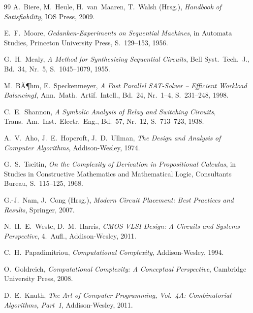 ﻿\documentclass[a4paper,12pt]{article}
\theoremstyle{definition}
\begin{document}
\begin{thebibliography}{99}
A.~Biere, M.~Heule, H.~van~Maaren, T.~Walsh (Hrsg.),
\emph{Handbook of Satisfiability},
IOS Press, 2009.

E.~F.~Moore,
\emph{Gedanken-Experiments on Sequential Machines},
in Automata Studies, Princeton University Press, S.~129--153, 1956.

G.~H.~Mealy,
\emph{A Method for Synthesizing Sequential Circuits},
Bell Syst.~Tech.~J., Bd.~34, Nr.~5, S.~1045--1079, 1955.

M.~BÃ¶hm, E.~Speckenmeyer,
\emph{A Fast Parallel SAT-Solver -- Efficient Workload BalancingI},
Ann.~Math.~Artif.~Intell., Bd.~24, Nr.~1--4, S.~231--248, 1998.

C.~E.~Shannon,
\emph{A Symbolic Analysis of Relay and Switching Circuits},
Trans.~Am.~Inst.~Electr.~Eng., Bd.~57, Nr.~12, S.~713--723, 1938.

A.~V.~Aho, J.~E.~Hopcroft, J.~D.~Ullman,
\emph{The Design and Analysis of Computer Algorithms},
Addison-Wesley, 1974.

G.~S.~Tseitin,
\emph{On the Complexity of Derivation in Propositional Calculus},
in Studies in Constructive Mathematics and Mathematical Logic,
Consultants Bureau, S.~115--125, 1968.

G.-J.~Nam, J.~Cong (Hrsg.),
\emph{Modern Circuit Placement: Best Practices and Results},
Springer, 2007.

N.~H.~E.~Weste, D.~M.~Harris,
\emph{CMOS VLSI Design: A Circuits and Systems Perspective},
4.~Aufl., Addison-Wesley, 2011.

C.~H.~Papadimitriou,
\emph{Computational Complexity},
Addison-Wesley, 1994.

O.~Goldreich,
\emph{Computational Complexity: A Conceptual Perspective},
Cambridge University Press, 2008.

D.~E.~Knuth,
\emph{The Art of Computer Programming, Vol.~4A: Combinatorial Algorithms,
Part~1},
Addison-Wesley, 2011.

\end{thebibliography}
\end{document}
